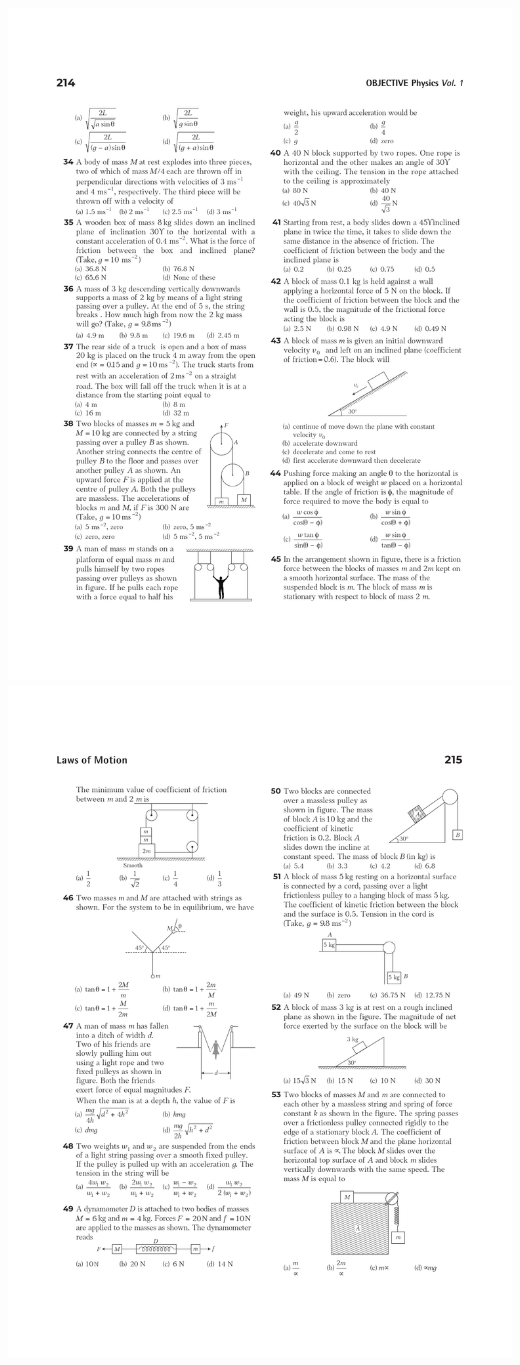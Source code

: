 \documentclass{article}
\begin{document}
\linebreak
\includegraphics[trim={2.5cm 0 2cm 0},clip, width=170 mm]{p34-45}
\linebreak
\includegraphics[trim={2.5cm 0 0.5cm 0},clip, width=80 mm]{p45}
\end{document}
